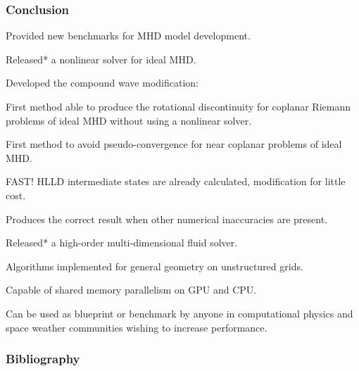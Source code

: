 \documentclass{beamer}
\begin{document}
\begin{frame}[fragile]
\frametitle{Conclusion}
\bei
\item Provided new benchmarks for MHD model development.
\item Released* a nonlinear solver for ideal MHD.
\item Developed the compound wave modification:
\bei
\item First method able to produce the rotational discontinuity for coplanar Riemann problems of ideal MHD without using a nonlinear solver.
\item First method to avoid pseudo-convergence for near coplanar problems of ideal MHD.
\item FAST! HLLD intermediate states are already calculated, modification for little cost.
\item Produces the correct result when other numerical inaccuracies are present.
\ebi
\item Released* a high-order multi-dimensional fluid solver.  
\bei 
\item Algorithms implemented for general geometry on unstructured grids. 
\item Capable of shared memory parallelism on GPU and CPU.
\item Can be used as blueprint or benchmark by anyone in computational physics and space weather communities wishing to increase performance. 
\ebi
\ebi
\end{frame}

\begin{frame}[allowframebreaks]
\frametitle{Bibliography}
\printbibliography	%
\end{frame}
\end{document}
